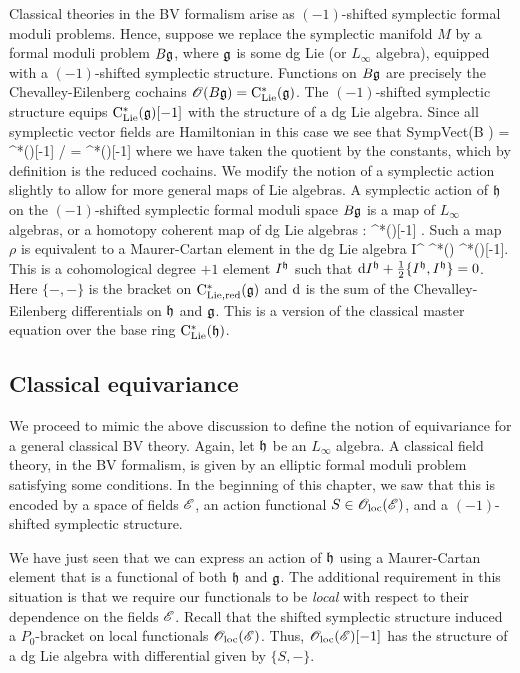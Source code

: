 Classical theories in the BV formalism arise as $(-1)$-shifted symplectic formal moduli problems.
Hence, suppose we replace the symplectic manifold $M$ by a formal moduli problem $B \mathfrak g$, where $\mathfrak g$ is some dg Lie (or $L_\infty$ algebra), equipped with a $(-1)$-shifted symplectic structure.
Functions on $B\mathfrak g$ are precisely the Chevalley-Eilenberg cochains $\mathscr O(B\mathfrak g) = {\rm C}_{{\rm Lie}}^*(\mathfrak g)$. 
The $(-1)$-shifted symplectic structure equips ${\rm C}_{{\rm Lie}}^*(\mathfrak g) [-1]$ with the structure of a dg Lie algebra.
Since all symplectic vector fields are Hamiltonian in this case we see that 
\ben
{\rm SympVect}(B \fg) = \clie^*(\fg)[-1] / \CC = \cred^*(\fg)[-1]
\een
where we have taken the quotient by the constants, which by definition is the reduced cochains. 
We modify the notion of a symplectic action slightly to allow for more general maps of Lie algebras.
A symplectic action of $\mathfrak h$ on the $(-1)$-shifted symplectic formal moduli space $B \mathfrak g$ is a map of $L_\infty$ algebras, or a homotopy coherent map of dg Lie algebras
\ben
\rho : \fh \rightsquigarrow \cred^*(\fg)[-1] .
\een
Such a map $\rho$ is equivalent to a Maurer-Cartan element in the dg Lie algebra
\ben
I^{\fh} \in \clie^*(\fh) \tensor \cred^*(\fg)[-1].
\een
This is a cohomological degree $+1$ element $I^\mathfrak h$ such that ${\rm d} I^\mathfrak h + \frac{1}{2}\{I^\mathfrak h, I^\mathfrak h\} = 0$.
Here $\{-,-\}$ is the bracket on ${\rm C}_{\rm Lie, red}^*(\mathfrak g)$ and ${\rm d}$ is the sum of the Chevalley-Eilenberg differentials on $\mathfrak h$ and $\mathfrak g$. 
This is a version of the classical master equation over the base ring ${\rm C}_{{\rm Lie}}^*(\mathfrak h)$. 

\subsection{Classical equivariance}

We proceed to mimic the above discussion to define the notion of equivariance for a general classical BV theory. 
Again, let $\mathfrak h$ be an $L_\infty$ algebra.
A classical field theory, in the BV formalism, is given by an elliptic formal moduli problem satisfying some conditions. 
In the beginning of this chapter, we saw that this is encoded by a space of fields $\mathscr E$, an action functional $S \in {\mathscr O}_{\rm loc}(\mathscr E)$, and a $(-1)$-shifted symplectic structure. 

We have just seen that we can express an action of $\mathfrak h$ using a Maurer-Cartan element that is a functional of both $\mathfrak h$ and $\mathfrak g$.
The additional requirement in this situation is that we require our functionals to be {\em local} with respect to their dependence on the fields $\mathscr E$. 
Recall that the shifted symplectic structure induced a $P_0$-bracket on local functionals ${\mathscr O}_{\rm loc}(\mathscr E)$.
Thus, ${\mathscr O}_{\rm loc}(\mathscr E)[-1]$ has the structure of a dg Lie algebra with differential given by $\{S,-\}$. 

